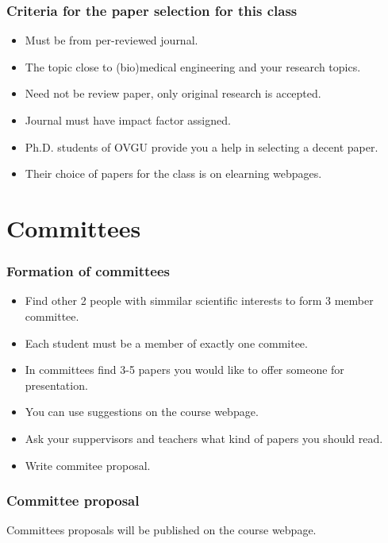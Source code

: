 \begin{frame}
\frametitle{Criteria for the paper selection for this class}
\begin{itemize}
\item Must be from per-reviewed journal.
\item The topic close to (bio)medical engineering and your research topics.
\item Need not be review paper, only original research is accepted.
\item Journal must have impact factor assigned.
\item Ph.D. students of OVGU provide you a help in selecting a decent paper.
\item Their choice of papers for the class is on elearning webpages.
\end{itemize}
\end{frame}

\section{Committees}
\begin{frame}
\frametitle{Formation of committees}
\begin{itemize}
\item Find other 2 people with simmilar scientific interests to form 3 member committee.
\item Each student must be a member of exactly one commitee.
\item In committees find 3-5 papers you would like to offer someone for presentation.
\item You can use suggestions on the course webpage.
\item Ask your suppervisors and teachers what kind of papers you should read.
\item Write commitee proposal.
\end{itemize}
\end{frame}



\begin{frame}
\frametitle{Committee proposal}

Committees proposals will be published on the course webpage.

\end{frame}
